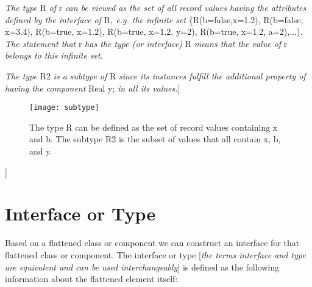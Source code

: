 \emph{The type} R \emph{of} r \emph{can be viewed as the set of all
record values having the attributes defined by the interface of}
R\emph{, e.g. the infinite set} \{R(b=false,x=1.2), R(b=false, x=3.4),
R(b=true, x=1.2), R(b=true, x=1.2, y=2), R(b=true, x=1.2,
a=2),...)\emph{. The statement that} r \emph{has the type (or
interface)} R \emph{means that the value of} r \emph{belongs to this
infinite set}.

\emph{The type} R2 \emph{is a subtype of} R \emph{since its instances
fulfill the additional property of having the component} Real y;
\emph{in all its values.}{]}

\begin{figure}
\caption{The type R can be defined as the set of
record values containing x and b. The subtype R2 is the subset of values
that all contain x, b, and y.}
\texttt{[image: subtype]}
\end{figure}
{]}

\section{Interface or Type}

Based on a flattened class or component we can construct an interface
for that flattened class or component. The interface or type
{[}\emph{the terms interface and type are equivalent and can be used
interchangeably}{]} is defined as the following information about the
flattened element itself:

